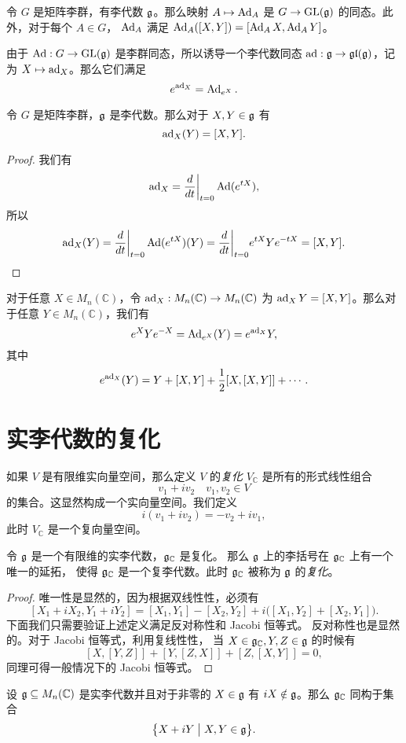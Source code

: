 \begin{proposition}
  令 $G$ 是矩阵李群，有李代数 $\mathfrak{g}$。那么映射 $A\mapsto \operatorname{Ad}_A$
  是 $G\to\operatorname{GL}(\mathfrak{g})$ 的同态。此外，对于每个 $A\in G$，
  $\operatorname{Ad}_A$ 满足 $\operatorname{Ad}_A([X,Y])=[\operatorname{Ad}_AX,\operatorname{Ad}_AY]$。
\end{proposition}

由于 $\operatorname{Ad}:G\to\operatorname{GL}(\mathfrak{g})$ 是李群同态，所以诱导一个李代数同态
$\operatorname{ad}:\mathfrak{g}\to \mathfrak{gl}(\mathfrak{g})$，记为 $X\mapsto \operatorname{ad}_X$。那么它们满足
\begin{equation}\label{eq:exp(ad)}
  e^{\operatorname{ad}_X}=\operatorname{Ad}_{e^X}.
\end{equation} 

\begin{proposition}
  令 $G$ 是矩阵李群，$\mathfrak{g}$ 是李代数。那么对于 $X,Y\in\mathfrak{g}$ 有
  \[
    \operatorname{ad}_X(Y)=[X,Y].
  \]
\end{proposition}
\begin{proof}
  我们有
  \[
    \operatorname{ad}_X=\frac{d}{dt}\bigg|_{t=0}\operatorname{Ad}({e^{tX}}),
  \]
  所以
  \[
    \operatorname{ad}_X(Y)=\frac{d}{dt}\bigg|_{t=0}\operatorname{Ad}({e^{tX}})(Y)
    =\frac{d}{dt}\bigg|_{t=0} e^{tX}Ye^{-tX}=[X,Y].\qedhere
  \]
\end{proof}

\begin{proposition}
  对于任意 $X\in M_n(\mathbb{C})$，令 $\operatorname{ad}_X:M_n(\mathbb{C})\to M_n(\mathbb{C})$
  为 $\operatorname{ad}_XY=[X,Y]$。那么对于任意 $Y\in M_n(\mathbb{C})$，我们有
  \[
    e^XYe^{-X}=\operatorname{Ad}_{e^X}(Y)=e^{\operatorname{ad}_X}Y,
  \]
  其中
  \[
    e^{\operatorname{ad}_X}(Y)=Y+[X,Y]+\frac{1}{2}[X,[X,Y]]+\cdots.
  \]
\end{proposition}

\section{实李代数的复化}

\begin{definition}
  如果 $V$ 是有限维实向量空间，那么定义 $V$ 的\emph{复化} $V_{\mathbb{C}}$
  是所有的形式线性组合
  \[
    v_1+iv_2\quad v_1,v_2\in V
  \]
  的集合。这显然构成一个实向量空间。我们定义 
  \[
    i(v_1+iv_2)=-v_2+iv_1,
  \]
  此时 $V_{\mathbb{C}}$ 是一个复向量空间。
\end{definition}

\begin{proposition}
  令 $\mathfrak{g}$ 是一个有限维的实李代数，$\mathfrak{g}_{\mathbb{C}}$ 是复化。
  那么 $\mathfrak{g}$ 上的李括号在 $\mathfrak{g}_{\mathbb{C}}$ 上有一个唯一的延拓，
  使得 $\mathfrak{g}_{\mathbb{C}}$ 是一个复李代数。此时 $\mathfrak{g}_{\mathbb{C}}$
  被称为 $\mathfrak{g}$ 的\emph{复化}。
\end{proposition}
\begin{proof}
  唯一性是显然的，因为根据双线性性，必须有
  \[
    [X_1+iX_2,Y_1+iY_2]=[X_1,Y_1]-[X_2,Y_2]+i\bigl(
      [X_1,Y_2]+[X_2,Y_1]
    \bigr).
  \]
  下面我们只需要验证上述定义满足反对称性和 Jacobi 恒等式。
  反对称性也是显然的。对于 Jacobi 恒等式，利用复线性性，
  当 $X\in\mathfrak{g}_{\mathbb{C}},Y,Z\in\mathfrak{g}$ 的时候有
  \[
    [X,[Y,Z]]+[Y,[Z,X]]+[Z,[X,Y]]=0,
  \]
  同理可得一般情况下的 Jacobi 恒等式。
\end{proof}

\begin{proposition}
  设 $\mathfrak{g}\subseteq M_n(\mathbb{C})$ 是实李代数并且对于非零的 $X\in\mathfrak{g}$
  有 $iX\notin\mathfrak{g}$。那么 $\mathfrak{g}_{\mathbb{C}}$ 同构于集合
  \[
    \bigl\{X+iY\bigm| X,Y\in\mathfrak{g}\bigr\}.
  \]
\end{proposition}




